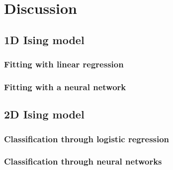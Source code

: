 \section{Discussion}

\subsection{1D Ising model}
\subsubsection{Fitting with linear regression}
\subsubsection{Fitting with a neural network}

\subsection{2D Ising model}
\subsubsection{Classification through logistic regression}
\subsubsection{Classification through neural networks}